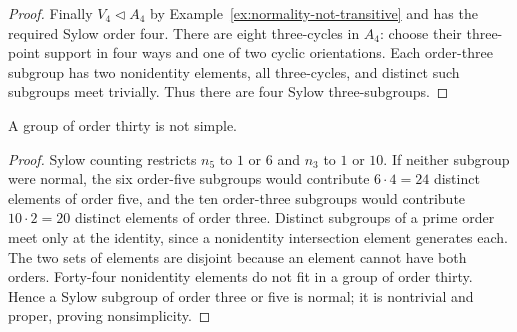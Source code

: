 \begin{proof}
Finally $V_4\mathrel{\triangleleft}A_4$ by Example~\ref{ex:normality-not-transitive} and has the required Sylow order four. There are eight three-cycles in $A_4$: choose their three-point support in four ways and one of two cyclic orientations. Each order-three subgroup has two nonidentity elements, all three-cycles, and distinct such subgroups meet trivially. Thus there are four Sylow three-subgroups.
\end{proof}

\begin{proposition}\label{prop:no-simple-thirty}
A group of order thirty is not simple.
\end{proposition}
\begin{proof}
Sylow counting restricts $n_5$ to $1$ or $6$ and $n_3$ to $1$ or $10$. If neither subgroup were normal, the six order-five subgroups would contribute $6\cdot4=24$ distinct elements of order five, and the ten order-three subgroups would contribute $10\cdot2=20$ distinct elements of order three. Distinct subgroups of a prime order meet only at the identity, since a nonidentity intersection element generates each. The two sets of elements are disjoint because an element cannot have both orders. Forty-four nonidentity elements do not fit in a group of order thirty. Hence a Sylow subgroup of order three or five is normal; it is nontrivial and proper, proving nonsimplicity.
\end{proof}

